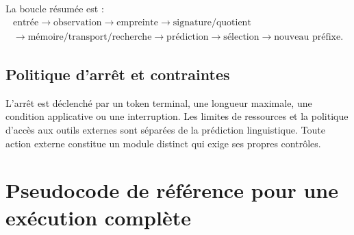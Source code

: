 \documentclass[11pt,a4paper]{article}
\theoremstyle{remark}
\begin{document}
La boucle résumée est :
\[
\boxed{\begin{gathered}\text{entrée}\to\text{observation}\to\text{empreinte}\to\text{signature/quotient}\\[0.25em]\to\text{mémoire/transport/recherche}\to\text{prédiction}\to\text{sélection}\to\text{nouveau préfixe}.\end{gathered}}
\]

\subsection{Politique d'arrêt et contraintes}
L'arrêt est déclenché par un token terminal, une longueur maximale, une condition applicative ou une interruption. Les limites de ressources et la politique d'accès aux outils externes sont séparées de la prédiction linguistique. Toute action externe constitue un module distinct qui exige ses propres contrôles.

\section{Pseudocode de référence pour une exécution complète}
\end{document}
